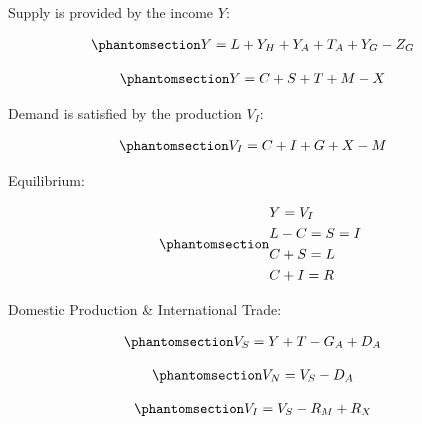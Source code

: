 \documentclass[
  letterpaper,
  DIV=11,
  numbers=noendperiod]{scrartcl}
\begin{document}
Supply is provided by the income \(Y\):

\begin{equation}\phantomsection\label{eq-ecoincome}{\begin{split} &
Y = L  + Y_H + Y_A + T_A + Y_G - Z_G
\end{split}}\end{equation}

\begin{equation}\phantomsection\label{eq-gdpsupply}{\begin{split} &
Y = C + S + T + M - X
\end{split}}\end{equation}

Demand is satisfied by the production \(V_I\):

\begin{equation}\phantomsection\label{eq-gdpdemand}{\begin{split} &
V_I = C + I + G + X - M
\end{split}}\end{equation}

Equilibrium:

\begin{equation}\phantomsection\label{eq-ecoequi}{\begin{split} &
Y = V_I       \\&
L - C = S = I        \\&
C + S = L        \\&
C + I = R
\end{split}}\end{equation}

Domestic Production \& International Trade:

\begin{equation}\phantomsection\label{eq-gdp}{\begin{split} &
V_S = Y + T - G_A + D_A
\end{split}}\end{equation}

\begin{equation}\phantomsection\label{eq-nnp}{\begin{split} &
V_N = V_S - D_A
\end{split}}\end{equation}

\begin{equation}\phantomsection\label{eq-gdp}{\begin{split} &
V_I = V_S - R_M + R_X
\end{split}}\end{equation}
\end{document}

